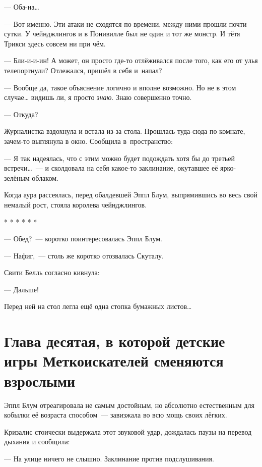 \documentclass[fontsize=11pt,a5paper,titlepage=firstcover]{scrbook}
\begin{document}
--- Оба-на{\ldots}

--- Вот именно. Эти атаки не сходятся по времени, между ними прошли почти сутки. У чейнджлингов и в Понивилле был не один и тот же монстр. И тётя Трикси здесь совсем ни при чём.

--- Бли-и-и-ин! А может, он просто где-то отлёживался после того, как его от улья телепортнули? Отлежался, пришёл в себя и~напал?

--- Вообще да, такое объяснение логично и вполне возможно. Но не в этом случае{\ldots} видишь ли, я просто \emph{знаю}. Знаю совершенно точно.

--- Откуда?

Журналистка вздохнула и встала из-за стола. Прошлась туда-сюда по комнате, зачем-то выглянула в окно. Сообщила в~пространство:

--- Я так надеялась, что с этим можно будет подождать хотя бы до третьей встречи{\ldots}~--- и сколдовала на себя какое-то заклинание, окутавшее её ярко-зелёным облаком.

Когда аура рассеялась, перед обалдевшей Эппл Блум, выпрямившись во весь свой немалый рост, стояла королева чейнджлингов.
\begin{center}* * * * * *\end{center}

--- Обед?~--- коротко поинтересовалась Эппл Блум.

--- Нафиг,~--- столь же коротко отозвалась Скуталу.

Свити Белль согласно кивнула:

--- Дальше!

Перед ней на стол легла ещё одна стопка бумажных листов{\ldots}



\chapter*{Глава десятая, в которой детские игры Меткоискателей сменяются взрослыми}


Эппл Блум отреагировала не самым достойным, но абсолютно естественным для кобылки её возраста способом~--- завизжала во всю мощь своих лёгких.

Кризалис стоически выдержала этот звуковой удар, дождалась паузы на перевод дыхания и сообщила:

--- На улице ничего не слышно. Заклинание против подслушивания.
\end{document}
